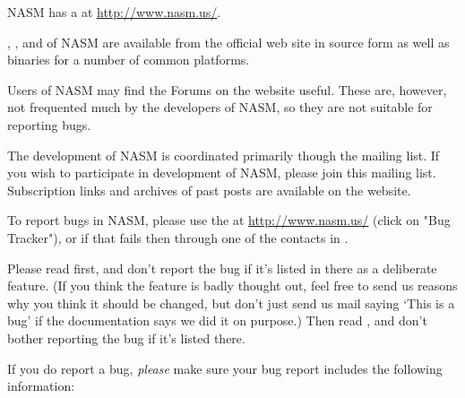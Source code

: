 %
%


NASM has a  at \href{http://www.nasm.us/}{http://www.nasm.us/}.

, , and
of NASM are available from the official web site in source form as well
as binaries for a number of common platforms.


Users of NASM may find the Forums on the website useful. These are,
however, not frequented much by the developers of NASM, so they are
not suitable for reporting bugs.


The development of NASM is coordinated primarily though the
 mailing list. If you wish to participate in
development of NASM, please join this mailing list. Subscription
links and archives of past posts are available on the website.


To report bugs in NASM, please use the  at
\href{http://www.nasm.us/}{http://www.nasm.us/} (click on "Bug Tracker"),
or if that fails then through one of the contacts in .

Please read  first, and don't report the bug if it's
listed in there as a deliberate feature. (If you think the feature
is badly thought out, feel free to send us reasons why you think it
should be changed, but don't just send us mail saying `This is a
bug' if the documentation says we did it on purpose.) Then read
, and don't bother reporting the bug if it's
listed there.

If you do report a bug, \emph{please} make sure your bug report includes
the following information:

